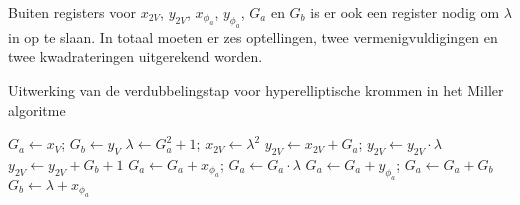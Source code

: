 Buiten registers voor $x_{2V}$, $y_{2V}$, $x_{\phi_a}$, $y_{\phi_a}$, $G_a$ en $G_b$ is er ook een register nodig om $\lambda$ in op te slaan. In totaal moeten er zes optellingen, twee vermenigvuldigingen en twee kwadrateringen uitgerekend worden.


\begin{algorithm}[h]
	\caption{Uitwerking van de verdubbelingstap voor hyperelliptische krommen in het Miller algoritme}
	\label{algoritme-implementatie-miller-double-detail}
	$G_a \leftarrow x_V$; $G_b \leftarrow y_V$\;
	$\lambda \leftarrow G_a^2 + 1$; $x_{2V} \leftarrow \lambda ^2$\;
	$y_{2V} \leftarrow x_{2V} + G_a$; $y_{2V} \leftarrow y_{2V} \cdot \lambda$\;
	$y_{2V} \leftarrow y_{2V} + G_b + 1$\;
	$G_a \leftarrow G_a + x_{\phi_a}$; $G_a \leftarrow G_a \cdot \lambda$\;
	$G_a \leftarrow G_a + y_{\phi_a}$; $G_a \leftarrow G_a + G_b$\;
	$G_b \leftarrow \lambda + x_{\phi_a}$\;
\end{algorithm}

